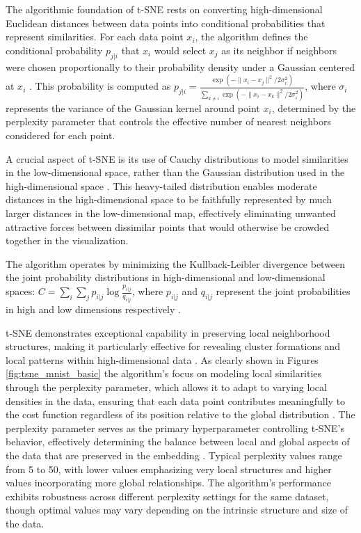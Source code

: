 The algorithmic foundation of t-SNE rests on converting high-dimensional Euclidean distances between data points into conditional probabilities that represent similarities. For each data point $x_i$, the algorithm defines the conditional probability $p_{j|i}$ that $x_i$ would select $x_j$ as its neighbor if neighbors were chosen proportionally to their probability density under a Gaussian centered at $x_i$ \cite{maaten2008tsne}. This probability is computed as $p_{j|i} = \frac{\exp(-\|x_i - x_j\|^2/2\sigma_i^2)}{\sum_{k \neq i} \exp(-\|x_i - x_k\|^2/2\sigma_i^2)}$, where $\sigma_i$ represents the variance of the Gaussian kernel around point $x_i$, determined by the perplexity parameter that controls the effective number of nearest neighbors considered for each point.

A crucial aspect of t-SNE is its use of Cauchy distributions to model similarities in the low-dimensional space, rather than the Gaussian distribution used in the high-dimensional space \cite{maaten2008tsne}. 
This heavy-tailed distribution enables moderate distances in the high-dimensional space to be faithfully represented by much larger distances in the low-dimensional map, effectively eliminating unwanted attractive forces between dissimilar points that would otherwise be crowded together in the visualization.

The algorithm operates by minimizing the Kullback-Leibler divergence between the joint probability distributions in high-dimensional and low-dimensional spaces: $C = \sum_i \sum_j p_{i|j} \log \frac{p_{i|j}}{q_{i|j}}$, where $p_{i|j}$ and $q_{i|j}$ represent the joint probabilities in high and low dimensions respectively \cite{maaten2008tsne}. 

t-SNE demonstrates exceptional capability in preserving local neighborhood structures, making it particularly effective for revealing cluster formations and local patterns within high-dimensional data \cite{yang2021dimensionality, maaten2008tsne}. As clearly shown in Figures \ref{fig:tsne_mnist_basic}
the algorithm's focus on modeling local similarities through the perplexity parameter, which allows it to adapt to varying local densities in the data, ensuring that each data point contributes meaningfully to the cost function regardless of its position relative to the global distribution \cite{maaten2008tsne}. 
The perplexity parameter serves as the primary hyperparameter controlling t-SNE's behavior, effectively determining the balance between local and global aspects of the data that are preserved in the embedding \cite{maaten2008tsne}. Typical perplexity values range from 5 to 50, with lower values emphasizing very local structures and higher values incorporating more global relationships. The algorithm's performance exhibits robustness across different perplexity settings for the same dataset, though optimal values may vary depending on the intrinsic structure and size of the data.

